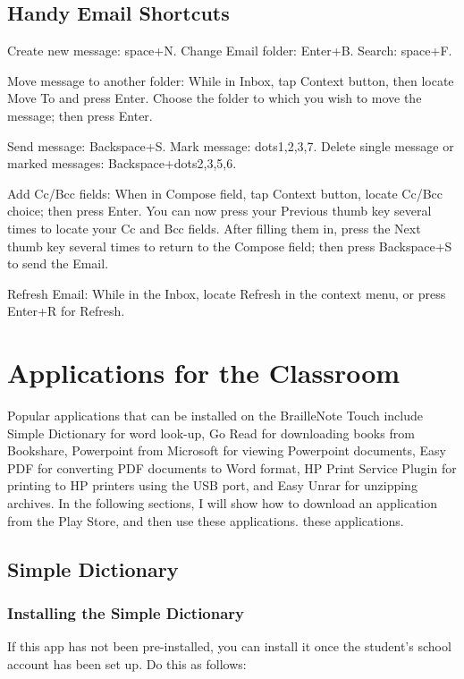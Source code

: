 \documentclass[10pt,letterpaper,twoside]{report}
\begin{document}
{{{\subsection{Handy Email Shortcuts}

Create new message: space+N.
Change Email folder: Enter+B.
Search: space+F.

Move message to another folder: While in Inbox, tap Context button, then locate Move To and press Enter. Choose the folder to which you wish to move the message; then press Enter.

Send message: Backspace+S.
Mark message: dots1,2,3,7.
Delete single message or marked messages: Backspace+dots2,3,5,6.

Add Cc/Bcc fields: When in Compose field, tap Context button, locate Cc/Bcc choice; then press Enter. You can now press your Previous thumb key several times to locate your Cc and Bcc fields. After filling them in, press the Next thumb key several times to return to the Compose field; then press Backspace+S to send the Email.

Refresh Email: While in the Inbox, locate Refresh in the context menu, or press Enter+R for Refresh.

\section{Applications for the Classroom}

Popular applications that can be installed on the BrailleNote Touch include Simple Dictionary for word look-up, Go Read for downloading books from Bookshare, Powerpoint from Microsoft for viewing Powerpoint documents, Easy PDF for converting PDF documents to Word format, HP Print Service Plugin for printing to HP printers using the USB port, and Easy Unrar for unzipping archives. In the following sections, I will show how to download an application from the Play Store, and then use these applications.
these applications.

\subsection{Simple Dictionary}

\subsubsection{Installing the Simple Dictionary}

If this app has not been pre-installed, you can install it once the student's school account has been set up. Do this as follows:

}}}
\end{document}
